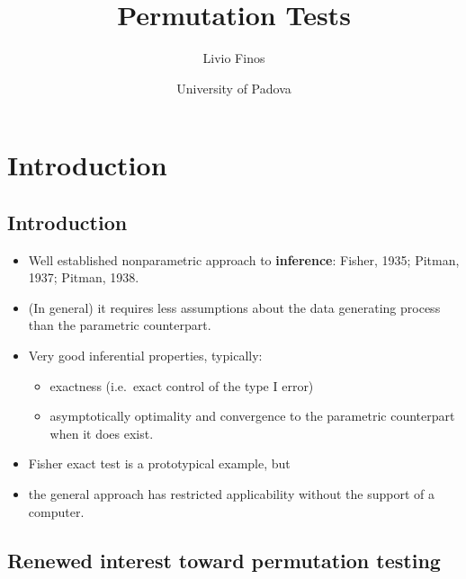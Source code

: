 \documentclass[
]{article}
\title{Permutation Tests}
\author{Livio Finos}
\date{University of Padova}
\providecommand{\tightlist}{%
  \setlength{\itemsep}{0pt}\setlength{\parskip}{0pt}}
\begin{document}
\maketitle

{
\setcounter{tocdepth}{2}
\tableofcontents
}
\hypertarget{introduction}{%
\section{Introduction}\label{introduction}}

\hypertarget{introduction-1}{%
\subsection{Introduction}\label{introduction-1}}

\begin{itemize}
\tightlist
\item
  Well established nonparametric approach to \textbf{inference}: Fisher,
  1935; Pitman, 1937; Pitman, 1938.\\
\item
  (In general) it requires less assumptions about the data generating
  process than the parametric counterpart.\\
\item
  Very good inferential properties, typically:

  \begin{itemize}
  \tightlist
  \item
    exactness (i.e.~exact control of the type I error)
  \item
    asymptotically optimality and convergence to the parametric
    counterpart when it does exist.
  \end{itemize}
\end{itemize}

\begin{itemize}
\tightlist
\item
  Fisher exact test is a prototypical example, but
\item
  the general approach has restricted applicability without the support
  of a computer.
\end{itemize}

\hypertarget{renewed-interest-toward-permutation-testing}{%
\subsection{Renewed interest toward permutation
testing}\label{renewed-interest-toward-permutation-testing}}
\end{document}
